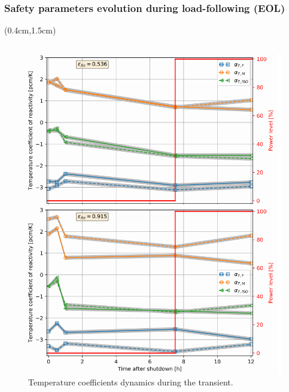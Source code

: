 \begin{frame}
\frametitle{Safety parameters evolution during load-following (EOL)}
\begin{textblock*}{12.5cm}(0.4cm,1.5cm) %
	\begin{columns}
		\column[t]{6.3cm}
		\begin{figure}[t]
			\begin{overprint}
				\includegraphics[width=0.87\linewidth]{./images/msbr_tc_evo.png}
				\vspace{-2mm}
				\caption{Temperature coefficients dynamics during the 
				transient.}

\end{overprint}
\end{figure}
\end{columns}
\end{textblock*}
\end{frame}
